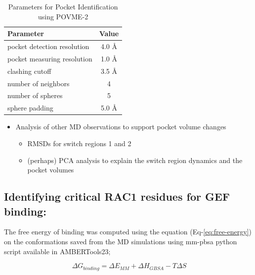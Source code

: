 \documentclass[12pt, a4paper]{achemso}
\begin{document}
    \begin{table}
  \caption{Parameters for Pocket Identification using POVME-2}
  \label{tbl:pocketID}
  \begin{tabular}{lc}
    \hline
   \textbf{Parameter}  & \textbf{Value} \\
    \hline
    pocket detection resolution	 & 4.0 \r{A}  \\
    pocket measuring resolution & 1.0 \r{A} \\
    clashing cutoff & 3.5 \r{A}  \\
    number of neighbors & 4  \\ 
    number of spheres & 5  \\
    sphere padding & 5.0 \r{A}  \\ 
    \hline
  \end{tabular}
\end{table}

\begin{itemize}
    \item Analysis of other MD observations to support pocket volume changes
        \begin{itemize}
            \item RMSDs for switch regions 1 and 2
            \item (perhaps) PCA analysis to explain the switch region dynamics and the pocket volumes
        \end{itemize}
\end{itemize}


\subsection{Identifying critical RAC1 residues for GEF binding:} 

The free energy of binding was computed using the equation (Eq-\ref{eq:free-energy}) on the conformations saved from the MD simulations using mm-pbsa python script\cite{mmpbsa} available in AMBERTools23; 

\begin{equation} \label{eq:free-energy}
 \   {\Delta}G_{binding} = {\Delta}E_{MM} + {\Delta}H_{GBSA} - T{\Delta}S   
\end{equation}
\end{document}
